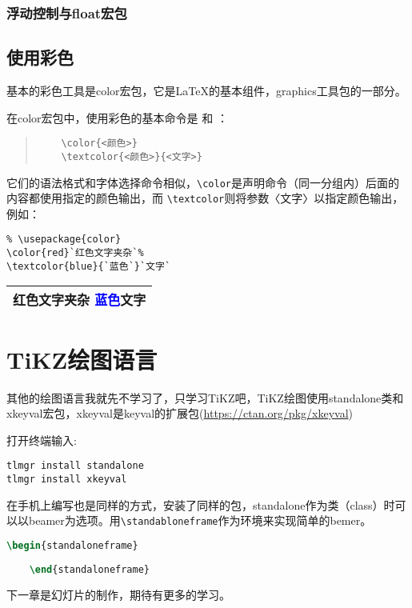 \subsubsection{浮动控制与float宏包}




\subsection{使用彩色}
基本的彩色工具是color宏包，它是\LaTeX 的基本组件，graphics工具包的一部分。

在color宏包中，使用彩色的基本命令是 {\color{blue}{\verb|\colr|}} 和 {\color{blue}{\verb|\textcolor|}} ：
\begin{quote} %
	\begin{verbatim}
	\color{<颜色>}
	\textcolor{<颜色>}{<文字>}
	\end{verbatim}  %
\end{quote} 
\noindent 它们的语法格式和字体选择命令相似，\verb|\color|是声明命令（同一分组内）后面的内容都使用指定的颜色输出，而 \verb|\textcolor|则将参数〈文字〉以指定颜色输出，例如：
\begin{table}[h]
	\begin{minipage}{0.5\linewidth}
		\begin{lstlisting}
% \usepackage{color}
\color{red}`红色文字夹杂`%
\textcolor{blue}{`蓝色`}`文字`
		\end{lstlisting}
	\end{minipage}
	\quad
	\begin{tabular}{|l|}
		\hline
		\color{red}红色文字夹杂%
		\textcolor{blue}{蓝色}文字\\
		\hline
	\end{tabular}
\end{table}

\section{TiKZ绘图语言}

其他的绘图语言我就先不学习了，只学习TiKZ吧，TiKZ绘图使用standalone类和xkeyval宏包，xkeyval是keyval的扩展包(\url{https://ctan.org/pkg/xkeyval})

打开终端输入:
\begin{lstlisting}
tlmgr install standalone
tlmgr install xkeyval
\end{lstlisting}

在手机上编写也是同样的方式，安装了同样的包，standalone作为类（class）时可以以beamer为选项。用\verb|\standabloneframe|作为环境来实现简单的bemer。

\begin{lstlisting}[language=tex]
	\begin{standaloneframe}
		
	\end{standaloneframe}
\end{lstlisting}

下一章是幻灯片的制作，期待有更多的学习。